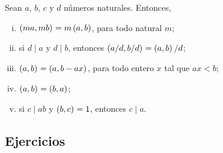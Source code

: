 \begin{teoDivisibilidad}%
	\label{teo:mcd:propiedades}
	Sean $a$, $b$, $c$ y $d$ n\'umeros naturales. Entonces,
	\begin{enumerate}[(i)]
		\item\label{item:mcd:propiedades:i}
			$\left({ma,mb}\right)_{}=m\left({a,b}\right)_{}$, para todo natural $m$;
		\item\label{item:mcd:propiedades:ii}
			si $d\mid a$ y $d\mid b$, entonces
			$\left({a/d,b/d}\right)_{}=\left({a,b}\right)_{}/d$;
		\item\label{item:mcd:propiedades:iii}
			$\left({a,b}\right)_{}=\left({a,b-ax}\right)_{}$, para todo entero $x$ tal
			que $ax<b$;
		\item\label{item:mcd:propiedades:iv}
			$\left({a,b}\right)_{}=\left({b,a}\right)_{}$;
		\item\label{item:mcd:propiedades:v}
			si $c\mid ab$ y $\left({b,c}\right)_{}=1$, entonces $c\mid a$.
	\end{enumerate}
\end{teoDivisibilidad}

\subsection*{Ejercicios}



